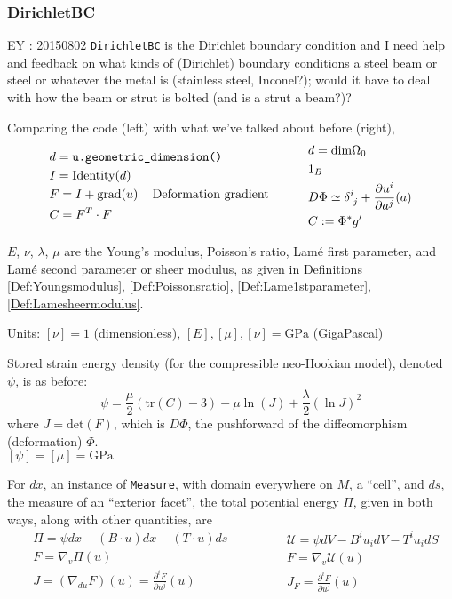 \documentclass[twoside,landscape,10pt]{amsart}
\theoremstyle{plain}
\theoremstyle{definition}
\theoremstyle{remark}
\begin{document}
\begin{multicols*}{2}
\subsubsection{DirichletBC}

EY : 20150802 \verb|DirichletBC| is the Dirichlet boundary condition and I need help and feedback on what kinds of (Dirichlet) boundary conditions a steel beam or steel or whatever the metal is (stainless steel, Inconel?); would it have to deal with how the beam or strut is bolted (and is a strut a beam?)?  

Comparing the code (left) with what we've talked about before (right), 
\[
\begin{aligned}
& d = \verb|u.geometric_dimension()| \\
& I = \text{Identity}(d) \\
& F = I + \text{grad}(u) \quad \, \text{Deformation gradient} \\
& C= F^T \cdot F
\end{aligned}
\quad \quad \quad \,
\begin{aligned}
& d = \text{dim}\Omega_0 \\ 
& 1_B \\ 
& D\Phi \simeq \delta^i_{\,\,j} + \frac{\partial u^i}{ \partial a^j}(a) \\
& C:= \Phi^* g'
\end{aligned}
\]

$E$, $\nu$, $\lambda$, $\mu$ are the Young's modulus, Poisson's ratio, Lam\'e first parameter, and Lam\'e second parameter or sheer modulus, as given in Definitions \ref{Def:Youngsmodulus}, \ref{Def:Poissonsratio}, \ref{Def:Lame1stparameter}, \ref{Def:Lamesheermodulus}.  

Units: $[\nu]=1$ (dimensionless), $[E],[\mu],[\nu]= \text{GPa}$ (GigaPascal)


Stored strain energy density (for the compressible neo-Hookian model), denoted $\psi$, is as before:
\[
\psi = \frac{\mu}{2}( \text{tr}(C) -3) - \mu \ln{(J)} + \frac{\lambda}{2}(\ln{J})^2
\]
where $J = \text{det}(F)$, which is $D\Phi$, the pushforward of the diffeomorphism (deformation) $\Phi$. \\ 
$[\psi] = [\mu] = \text{GPa}$

For $dx$, an instance of \verb|Measure|, with domain everywhere on $M$, a ``cell'', and $ds$, the measure of an ``exterior facet'', the total potential energy $\Pi$, given in both ways, along with other quantities, are 
\[
\begin{aligned}
  & \Pi = \psi dx - (B\cdot u) dx - (T\cdot u) ds  \\
& F = \nabla_v \Pi(u) \\
& J = (\nabla_{du}F)(u) =\frac{ \partial^i F}{ \partial u^j}(u)
\end{aligned} \quad \quad \quad \, 
\begin{aligned}
& \mathcal{U} = \psi dV - B^i u_i dV - T^i u_i dS \\ 
& F = \nabla_v \mathcal{U}(u) \\ 
& J_F =\frac{ \partial^i F}{ \partial u^j}(u)
\end{aligned}
\]


\end{multicols*}
\end{document}
